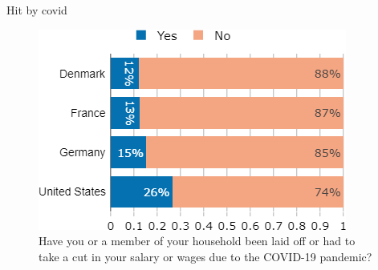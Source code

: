 \documentclass[aspectratio=169,9pt,dvipsnames]{beamer}
\begin{document}

\begin{frame}{Hit by covid}%
\begin{figure}[h!]
\caption{Have you or a member of your household been laid off or had to take a cut in your salary or wages due to the COVID-19 pandemic?}
\includegraphics[width=.55\textwidth]{../figures/country_comparison/hit_by_covid_countries.png}
\end{figure}
\end{frame}
\end{document}
